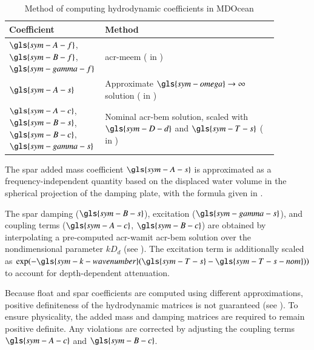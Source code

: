 \begin{table}[htbp]
    \centering
    \caption{Method of computing hydrodynamic coefficients in MDOcean}
    \label{tab:hydro-methods}
    \begin{tabular}
    {M{0.25\linewidth}M{0.63\linewidth}}
         Coefficient& Method\\ \hline
         $\gls{sym-A-f}$, $\gls{sym-B-f}$, $\gls{sym-gamma-f}$ & \gls{acr-meem} ( in )\\
         $\gls{sym-A-s}$& Approximate $\gls{sym-omega}\rightarrow\infty$ solution ( in )\\
         $\gls{sym-A-c}$, $\gls{sym-B-s}$, $\gls{sym-B-c}$, $\gls{sym-gamma-s}$& Nominal \gls{acr-bem} solution, scaled with $\gls{sym-D-d}$ and $\gls{sym-T-s}$ ( in )\\
    \end{tabular}
\end{table}
The spar added mass coefficient $\gls{sym-A-s}$ is approximated as a frequency-independent quantity based on the displaced water volume in the spherical projection of the damping plate, with the formula given in .

The spar damping ($\gls{sym-B-s}$), excitation ($\gls{sym-gamma-s}$), and coupling terms ($\gls{sym-A-c}$, $\gls{sym-B-c}$) are obtained by interpolating a pre-computed \gls{acr-wamit} \gls{acr-bem} solution over the nondimensional parameter $kD_d$ (see ).
The excitation term is additionally scaled as $\exp(-\gls{sym-k-wavenumber}(\gls{sym-T-s} - \gls{sym-T-s-nom}))$ to account for depth-dependent attenuation.


Because float and spar coefficients are computed using different approximations, positive definiteness of the hydrodynamic matrices is not guaranteed (see ).
To ensure physicality, the added mass and damping matrices are required to remain positive definite.
Any violations are corrected by adjusting the coupling terms $\gls{sym-A-c}$ and $\gls{sym-B-c}$.

